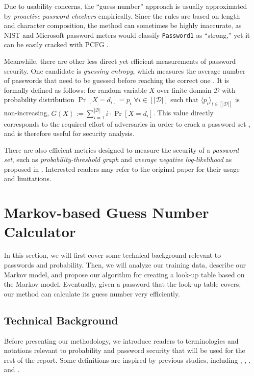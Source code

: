 \documentclass{article} %
\theoremstyle{definition}
\theoremstyle{theorem}
\theoremstyle{remark}
\theoremstyle{remark}
\begin{document}
\par\quad Due to usability concerns, the ``guess number'' approach is usually approximated by \emph{proactive password checkers} empirically. Since the rules are based on length and character composition, the method can sometimes be highly inaccurate, as NIST and Microsoft password meters would classify \texttt{Password1} as ``strong,'' yet it can be easily cracked with PCFG \cite{adaptive markov}.

\par\quad Meanwhile, there are other less direct yet efficient measurements of password security. One candidate is \emph{guessing entropy}, which measures the average number of passwords that need to be guessed before reaching the correct one \cite{adaptive markov}. It is formally defined as follows: for random variable $X$ over finite domain $\mathcal{D}$ with probability distribution $\Pr[X=d_i]=p_i \;\forall i\in[|\mathcal{D}|]$ such that $\langle p_i \rangle_{i\in[|\mathcal{D}|]}$ is non-increasing, $G(X) := \sum_{i=1}^{|\mathcal{D}|}{i \cdot \Pr[X=d_i]}$. This value directly corresponds to the required effort of adversaries in order to crack a password set \cite{entropy}, and is therefore useful for security analysis.

\par\quad There are also efficient metrics designed to measure the security of a \emph{password set}, such as \emph{probability-threshold graph} and \emph{average negative log-likelihood} as proposed in \cite{probabilistic}. Interested readers may refer to the original paper for their usage and limitations.

\section{Markov-based Guess Number Calculator}
\par\quad In this section, we will first cover some technical background relevant to passwords and probability. Then, we will analyze our training data, describe our Markov model, and propose our algorithm for creating a look-up table based on the Markov model. Eventually, given a password that the look-up table covers, our method can calculate its guess number very efficiently.

\subsection{Technical Background}
\par\quad Before presenting our methodology, we introduce readers to terminologies and notations relevant to probability and password security that will be used for the rest of the report. Some definitions are inspired by previous studies, including \cite{adaptive markov}, \cite{omen}, \cite{probabilistic}, and \cite{timespace}.
\end{document}
